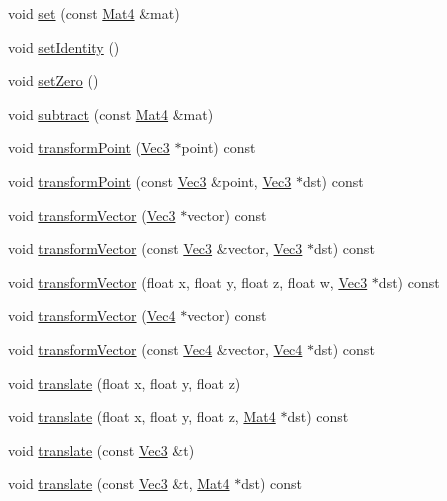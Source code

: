 \begin{DoxyCompactItemize}
void \hyperlink{classMat4_a4673b21f6cf96fb2274be6227a877061}{set} (const \hyperlink{classMat4}{Mat4} \&mat)
\item 
void \hyperlink{classMat4_a0d20e8d7fbbc17531bb81a1446b85c98}{set\+Identity} ()
\item 
void \hyperlink{classMat4_a252b7afb2cfcd5e814fa2d3118d05de3}{set\+Zero} ()
\item 
void \hyperlink{classMat4_a3ad911389ec778e8f67aaced32be9193}{subtract} (const \hyperlink{classMat4}{Mat4} \&mat)
\item 
void \hyperlink{classMat4_a70e0d4c59e366d1c51cf6c086ec8fb58}{transform\+Point} (\hyperlink{classVec3}{Vec3} $\ast$point) const
\item 
void \hyperlink{classMat4_af85f1c69ea4ca7632d541fb12d3b23a5}{transform\+Point} (const \hyperlink{classVec3}{Vec3} \&point, \hyperlink{classVec3}{Vec3} $\ast$dst) const
\item 
void \hyperlink{classMat4_a2f5efde7152fb9e50d1e8fd45e7012bb}{transform\+Vector} (\hyperlink{classVec3}{Vec3} $\ast$vector) const
\item 
void \hyperlink{classMat4_ae115470538b721dfd6dda37b4d487805}{transform\+Vector} (const \hyperlink{classVec3}{Vec3} \&vector, \hyperlink{classVec3}{Vec3} $\ast$dst) const
\item 
void \hyperlink{classMat4_a61a1ba4cf3f23320cf351137bef9fc75}{transform\+Vector} (float x, float y, float z, float w, \hyperlink{classVec3}{Vec3} $\ast$dst) const
\item 
void \hyperlink{classMat4_a2c78f362e212324aa1ec085aefc07b78}{transform\+Vector} (\hyperlink{classVec4}{Vec4} $\ast$vector) const
\item 
void \hyperlink{classMat4_ac710d11704a735e831671574b5e1d7aa}{transform\+Vector} (const \hyperlink{classVec4}{Vec4} \&vector, \hyperlink{classVec4}{Vec4} $\ast$dst) const
\item 
void \hyperlink{classMat4_a09a0ca603f65a1c1c79ecfb5aca40025}{translate} (float x, float y, float z)
\item 
void \hyperlink{classMat4_a8b6185d434fa5a2308ea905f4ba6e233}{translate} (float x, float y, float z, \hyperlink{classMat4}{Mat4} $\ast$dst) const
\item 
void \hyperlink{classMat4_a651029cb9f07ca74d0ddc3b28689b35c}{translate} (const \hyperlink{classVec3}{Vec3} \&t)
\item 
void \hyperlink{classMat4_a7022f7bcb5a6b22d7fa86cfe908c6d91}{translate} (const \hyperlink{classVec3}{Vec3} \&t, \hyperlink{classMat4}{Mat4} $\ast$dst) const

\end{DoxyCompactItemize}
